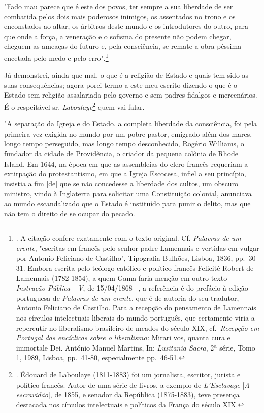 "Fado mau parece que é este dos povos, ter sempre a sua liberdade de ser
combatida pelos dois mais poderosos inimigos, os assentados no trono e
os enconstados ao altar, os árbitros deste mundo e os introdutores do
outro, para que onde a força, a veneração e o sofisma do presente não
podem chegar, cheguem as ameaças do futuro e, pela consciência, se
remate a obra péssima encetada pelo medo e pelo erro".\footnote{. A
  citação confere exatamente com o texto original. Cf. \emph{Palavras de
  um crente}, "escritas em francês pelo senhor padre Lamennais e
  vertidas em vulgar por Antonio Feliciano de Castilho", Tipografia
  Bulhões, Lisboa, 1836, pp.~30-31. Embora escrita pelo teólogo católico
  e político francês Felicité Robert de Lamennais (1782-1854), a quem
  Gama faria menção em outro texto -- \emph{Instrução Pública - V}, de
  15/04/1868 --, a referência é do prefácio à edição portuguesa de
  \emph{Palavras de um crente}, que é de autoria do seu tradutor,
  Antonio Feliciano de Castilho. Para a recepção do pensamento de
  Lamennais nos círculos intelectuais liberais do mundo português, que
  certamente viria a repercutir no liberalismo brasileiro de meados do
  século XIX, cf.~\emph{Recepção em Portugal das encíclicas sobre o
  liberalismo:} Mirari vos, quanta cura e immortale Dei. António Manuel
  Martins, In: \emph{Lusitania Sacra}, 2ª série, Tomo 1, 1989, Lisboa,
  pp.~41-80, especialmente pp.~46-51.}

Já demonstrei, ainda que mal, o que é a religião de Estado e quais tem
sido as suas consequências; agora porei termo a este meu escrito dizendo
o que é o Estado sem religião assalariada pelo governo e sem padres
fidalgos e mercenários. É o respeitável sr. \emph{Laboulaye}\footnote{.
  Édouard de Laboulaye (1811-1883) foi um jornalista, escritor, jurista
  e político francês. Autor de uma série de livros, a exemplo de
  \emph{L'Esclavage} {[}\emph{A escravidão}{]}, de 1855, e senador da
  República (1875-1883), teve presença destacada nos círculos
  intelectuais e políticos da França do século XIX.} quem vai falar.

"A separação da Igreja e do Estado, a completa liberdade da consciência,
foi pela primeira vez exigida no mundo por um pobre pastor, emigrado
além dos mares, longo tempo perseguido, mas longo tempo desconhecido,
Rogério Williams, o fundador da cidade de Providência, o criador da
pequena colônia de Rhode Island. Em 1644, na época em que as assembleias
do clero francês requeriam a extirpação do protestantismo, em que a
Igreja Escocesa, infiel a seu princípio, insistia a fim {[}de{]} que se
não concedesse a liberdade dos cultos, um obscuro ministro, vindo à
Inglaterra para solicitar uma Constituição colonial, anunciava ao mundo
escandalizado que o Estado é instituído para punir o delito, mas que não
tem o direito de se ocupar do pecado.

